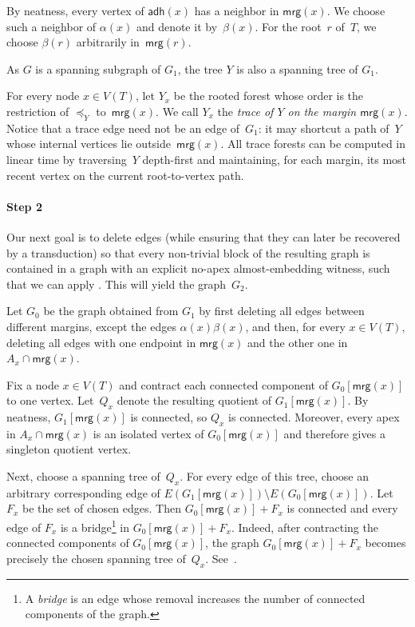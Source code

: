 \documentclass[1p,number,11pt]{elsarticle}
\theoremstyle{plain}
\newcommand{\mrg}{\mathsf{mrg}}
\newcommand{\adh}{\mathsf{adh}}
\begin{document}
By neatness, every vertex of $\adh(x)$ has a neighbor in $\mrg(x)$.
We choose such a neighbor of $\alpha(x)$ and denote it by~$\beta(x)$.
For the root~$r$ of~$T$, we choose $\beta(r)$ arbitrarily in~$\mrg(r)$.

\medskip
As $G$ is a spanning subgraph of $G_1$, the tree $Y$ is also a spanning tree of $G_1$.

For every node $x\in V(T)$, let $Y_x$ be the rooted forest whose order is the
restriction of $\preceq_Y$ to~$\mrg(x)$. 
We call $Y_x$ the \emph{trace of
$Y$ on the margin $\mrg(x)$}.  Notice that a trace edge need not be an edge
of~$G_1$: it may shortcut a path of~$Y$ whose internal vertices
lie outside~$\mrg(x)$.  All trace forests can be computed in linear time by traversing~$Y$
depth-first and maintaining, for each margin, its most recent vertex on the
current root-to-vertex path.

\paragraph{Step 2}
Our next goal is to delete edges (while ensuring that they can later be
recovered by a transduction) so that every non-trivial block of the resulting
graph is contained in a graph with an explicit no-apex almost-embedding
witness, such that we can apply . This will yield the graph~$G_2$.

Let $G_0$ be the graph obtained from $G_1$ by first deleting all edges between different margins, except the edges $\alpha(x)\beta(x)$, and then, for every $x\in V(T)$, deleting all edges with one endpoint in $\mrg(x)$ and the other one in $A_x\cap\mrg(x)$.

Fix a node $x\in V(T)$ and contract each connected component of $G_0[\mrg(x)]$ to one vertex.
Let~$Q_x$ denote the resulting quotient of $G_1[\mrg(x)]$.
By neatness, $G_1[\mrg(x)]$ is connected, so $Q_x$ is connected.
Moreover, every apex in $A_x\cap\mrg(x)$ is an isolated vertex of $G_0[\mrg(x)]$ and therefore gives a singleton quotient vertex.

Next, choose a spanning tree of~$Q_x$.
For every edge of this tree, choose an arbitrary corresponding edge of $E(G_1[\mrg(x)])\setminus E(G_0[\mrg(x)])$.
Let~$F_x$ be the set of chosen edges.
Then $G_0[\mrg(x)]+F_x$ is connected and every edge of $F_x$ is a bridge\footnote{A \emph{bridge} is an edge whose removal increases the number of connected components of the graph.} in $G_0[\mrg(x)]+F_x$.
Indeed, after contracting the connected components of $G_0[\mrg(x)]$, the graph $G_0[\mrg(x)]+F_x$ becomes precisely the chosen spanning tree of~$Q_x$.
See~.
\end{document}
